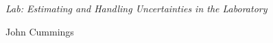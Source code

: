 {\LARGE {\em \noindent Lab: Estimating and Handling Uncertainties in the Laboratory}}

\large{\noindent John Cummings}

